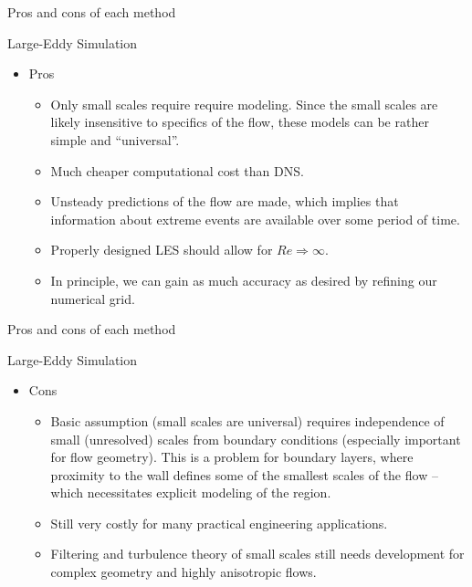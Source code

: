 \begin{frame}{Pros and cons of each method}

Large-Eddy Simulation
\begin{itemize}
	\item Pros
	\begin{itemize}
		\item Only small scales require require modeling. Since the small scales are likely insensitive to specifics of the flow, these models can be rather simple and ``universal''.
		\item Much cheaper computational cost than DNS.
		\item Unsteady predictions of the flow are made, which implies that information about extreme events are available over some period of time.
		\item Properly designed LES should allow for $Re\Rightarrow\infty$.
		\item In principle, we can gain as much accuracy as desired by refining our numerical grid.
	\end{itemize}

\end{itemize}
\end{frame}


\begin{frame}{Pros and cons of each method}

Large-Eddy Simulation
\begin{itemize}
	\item Cons
	\begin{itemize}
		\item Basic assumption (small scales are universal) requires independence of small (unresolved) scales from boundary conditions (especially important for flow geometry). This is a problem for boundary layers, where proximity to the wall defines some of the smallest scales of the flow -- which necessitates explicit modeling of the region.
		\item Still very costly for many practical engineering applications.
		\item Filtering and turbulence theory of small scales still needs development for complex geometry and highly anisotropic flows.
	\end{itemize}

\end{itemize}
\end{frame}


